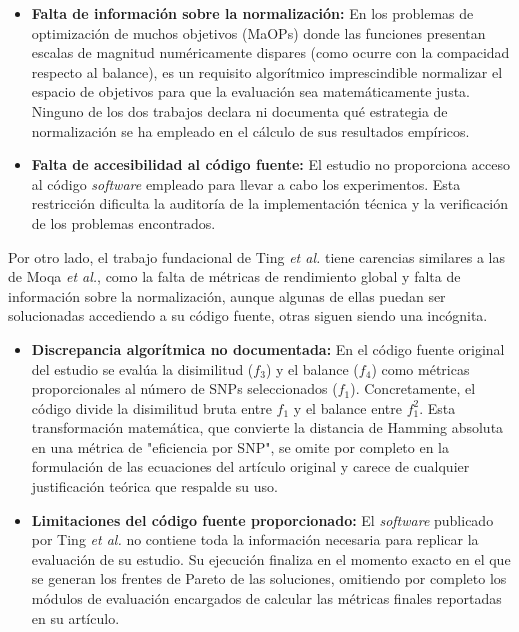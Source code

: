 \begin{itemize}
    \item \textbf{Falta de información sobre la normalización:} En los problemas de optimización de muchos objetivos (MaOPs) donde las funciones presentan escalas de magnitud numéricamente dispares (como ocurre con la compacidad respecto al balance), es un requisito algorítmico imprescindible normalizar el espacio de objetivos para que la evaluación sea matemáticamente justa. Ninguno de los dos trabajos declara ni documenta qué estrategia de normalización se ha empleado en el cálculo de sus resultados empíricos.
    \item \textbf{Falta de accesibilidad al código fuente:} El estudio no proporciona acceso al código \textit{software} empleado para llevar a cabo los experimentos. Esta restricción dificulta la auditoría de la implementación técnica y la verificación de los problemas encontrados.
\end{itemize}
    
Por otro lado, el trabajo fundacional de Ting \textit{et al.} \cite{ting2010multi} tiene carencias similares a las de Moqa \textit{et al.}, como la falta de métricas de rendimiento global y falta de información sobre la normalización, aunque algunas de ellas puedan ser solucionadas accediendo a su código fuente, otras siguen siendo una incógnita.

\begin{itemize}
    \item \textbf{Discrepancia algorítmica no documentada:} En el código fuente original del estudio se evalúa la disimilitud ($f_3$) y el balance ($f_4$) como métricas proporcionales al número de SNPs seleccionados ($f_1$). Concretamente, el código divide la disimilitud bruta entre $f_1$ y el balance entre $f_1^2$. Esta transformación matemática, que convierte la distancia de Hamming absoluta en una métrica de "eficiencia por SNP", se omite por completo en la formulación de las ecuaciones del artículo original y carece de cualquier justificación teórica que respalde su uso.
    \item \textbf{Limitaciones del código fuente proporcionado:} El \textit{software} publicado por Ting \textit{et al.} no contiene toda la información necesaria para replicar la evaluación de su estudio. Su ejecución finaliza en el momento exacto en el que se generan los frentes de Pareto de las soluciones, omitiendo por completo los módulos de evaluación encargados de calcular las métricas finales reportadas en su artículo.
\end{itemize}

